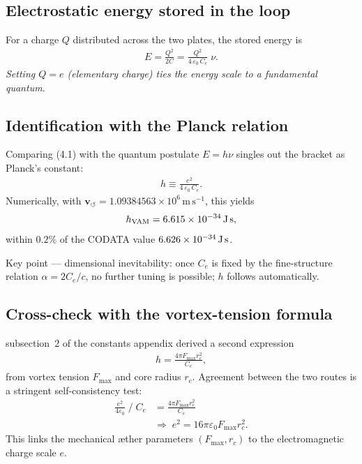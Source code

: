 \subsection{Electrostatic energy stored in the loop}

For a charge $Q$ distributed across the two plates, the stored energy is
\begin{align}
    E = \frac{Q^2}{2C}
      = \frac{Q^2}{4\,\varepsilon_0\,C_e}\;\nu.
    \tag{4.1}
\end{align}
\textit{Setting $Q=e$ (elementary charge) ties the energy scale to a fundamental quantum.}

\subsection{Identification with the Planck relation}

Comparing (4.1) with the quantum postulate $E = h\nu$ singles out the bracket as Planck’s constant:
\begin{align}
    h \equiv \frac{e^{2}}{4\,\varepsilon_0\,C_e}.
    \tag{5.1}
\end{align}
Numerically, with $\mathbf{v}_{\scriptscriptstyle\boldsymbol{\circlearrowleft}} = 1.09384563\times10^{6}\,\text{m}\,\text{s}^{-1}$, this yields
\[
    h_{\text{VAM}} = 6.615\times10^{-34}\,\text{J\,s},
\]
within $0.2\%$ of the CODATA value $6.626\times10^{-34}\,\text{J\,s}$.

Key point --- dimensional inevitability: once $C_e$ is fixed by the fine-structure relation $\alpha = 2C_e/c$, no further tuning is possible; $h$ follows automatically.

\subsection{Cross-check with the vortex-tension formula}

subsection~2 of the constants appendix derived a second expression
\begin{align}
    h = \frac{4\pi F_{\max} r_c^{2}}{C_e},
\end{align}
from vortex tension $F_{\max}$ and core radius $r_c$. Agreement between the two routes is a stringent self-consistency test:
\begin{align*}
    \frac{e^{2}}{4\varepsilon_0}\;\big/\;C_e
    &= \frac{4\pi F_{\max} r_c^{2}}{C_e} \\
    &\Longrightarrow\;
    e^{2} = 16\pi\varepsilon_0 F_{\max} r_c^{2}.
\end{align*}
This links the mechanical æther parameters $(F_{\max}, r_c)$ to the electromagnetic charge scale $e$.

